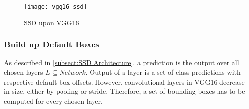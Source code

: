 
\begin{figure}[ht]
    \centering
    \texttt{[image: vgg16-ssd]}
    \caption{SSD upon VGG16}
    \label{fig:ssd-vgg}
\end{figure}

\subsubsection{Build up Default Boxes}\label{subsect:Build up Default Boxes}
As described in \autoref{subsect:SSD Architecture}, a prediction is the output 
over all chosen \glspl{layer} \(L\subseteq Network\). Output of a \gls{layer} is 
a set of class predictions with respective default box offsets. However, 
convolutional \glspl{layer} in VGG16 decrease in size, either by pooling or 
stride. Therefore, a set of bounding boxes has to be computed for every chosen 
\gls{layer}.\\

